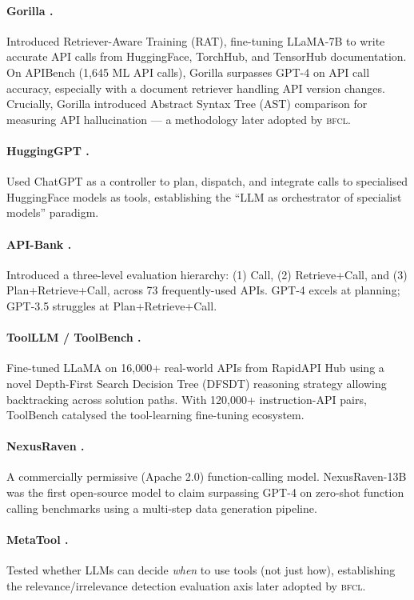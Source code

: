 \documentclass[11pt]{article}
\newcommand{\bfcl}{\textsc{bfcl}}
\begin{document}
\paragraph{Gorilla \citep{patil2023gorilla}.}
Introduced Retriever-Aware Training (RAT), fine-tuning LLaMA-7B to write accurate API calls from
HuggingFace, TorchHub, and TensorHub documentation. On APIBench (1,645 ML API calls), Gorilla
surpasses GPT-4 on API call accuracy, especially with a document retriever handling API version
changes. Crucially, Gorilla introduced Abstract Syntax Tree (AST) comparison for measuring API
hallucination --- a methodology later adopted by \bfcl{}.

\paragraph{HuggingGPT \citep{shen2023hugginggpt}.}
Used ChatGPT as a controller to plan, dispatch, and integrate calls to specialised HuggingFace
models as tools, establishing the ``LLM as orchestrator of specialist models'' paradigm.

\paragraph{API-Bank \citep{li2023apibank}.}
Introduced a three-level evaluation hierarchy: (1) Call, (2) Retrieve+Call, and (3)
Plan+Retrieve+Call, across 73 frequently-used APIs. GPT-4 excels at planning; GPT-3.5 struggles at
Plan+Retrieve+Call.

\paragraph{ToolLLM / ToolBench \citep{qin2024toolllm}.}
Fine-tuned LLaMA on 16,000+ real-world APIs from RapidAPI Hub using a novel Depth-First Search
Decision Tree (DFSDT) reasoning strategy allowing backtracking across solution paths. With 120,000+
instruction-API pairs, ToolBench catalysed the tool-learning fine-tuning ecosystem.

\paragraph{NexusRaven \citep{srinivasan2023nexusraven}.}
A commercially permissive (Apache 2.0) function-calling model. NexusRaven-13B was the first
open-source model to claim surpassing GPT-4 on zero-shot function calling benchmarks using a
multi-step data generation pipeline.

\paragraph{MetaTool \citep{huang2023metatool}.}
Tested whether LLMs can decide \emph{when} to use tools (not just how), establishing the
relevance/irrelevance detection evaluation axis later adopted by \bfcl{}.
\end{document}
